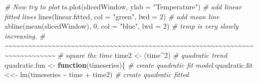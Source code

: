 \documentclass[
]{article}
\newenvironment{Shaded}{\begin{snugshade}}{\end{snugshade}}
\newcommand{\AttributeTok}[1]{\textcolor[rgb]{0.77,0.63,0.00}{#1}}
\newcommand{\CommentTok}[1]{\textcolor[rgb]{0.56,0.35,0.01}{\textit{#1}}}
\newcommand{\ControlFlowTok}[1]{\textcolor[rgb]{0.13,0.29,0.53}{\textbf{#1}}}
\newcommand{\DecValTok}[1]{\textcolor[rgb]{0.00,0.00,0.81}{#1}}
\newcommand{\FunctionTok}[1]{\textcolor[rgb]{0.00,0.00,0.00}{#1}}
\newcommand{\NormalTok}[1]{#1}
\newcommand{\OtherTok}[1]{\textcolor[rgb]{0.56,0.35,0.01}{#1}}
\newcommand{\SpecialCharTok}[1]{\textcolor[rgb]{0.00,0.00,0.00}{#1}}
\newcommand{\StringTok}[1]{\textcolor[rgb]{0.31,0.60,0.02}{#1}}
\begin{document}
\begin{Shaded}
\begin{Highlighting}[]
\CommentTok{\# Now try to plot}
\FunctionTok{ts.plot}\NormalTok{(slicedWindow, }\AttributeTok{ylab =} \StringTok{"Temperature"}\NormalTok{)}
\CommentTok{\# add linear fitted lines}
\FunctionTok{lines}\NormalTok{(linear.fitted, }\AttributeTok{col =} \StringTok{"green"}\NormalTok{, }\AttributeTok{lwd =} \DecValTok{2}\NormalTok{)}
\CommentTok{\# add mean line}
\FunctionTok{abline}\NormalTok{(}\FunctionTok{mean}\NormalTok{(slicedWindow), }\DecValTok{0}\NormalTok{, }\AttributeTok{col =} \StringTok{"blue"}\NormalTok{, }\AttributeTok{lwd =} \DecValTok{2}\NormalTok{)}
\CommentTok{\# temp is very slowly increasing.}
\CommentTok{\# \textasciitilde{}\textasciitilde{}\textasciitilde{}\textasciitilde{}\textasciitilde{}\textasciitilde{}\textasciitilde{}\textasciitilde{}\textasciitilde{}\textasciitilde{}\textasciitilde{}\textasciitilde{}\textasciitilde{}\textasciitilde{}\textasciitilde{}\textasciitilde{}\textasciitilde{}\textasciitilde{}\textasciitilde{}\textasciitilde{}\textasciitilde{}\textasciitilde{}\textasciitilde{}\textasciitilde{}\textasciitilde{}\textasciitilde{}\textasciitilde{}\textasciitilde{}\textasciitilde{}\textasciitilde{}\textasciitilde{}\textasciitilde{}\textasciitilde{}\textasciitilde{}\textasciitilde{}\textasciitilde{}\textasciitilde{}\textasciitilde{}\textasciitilde{}\textasciitilde{}\textasciitilde{}\textasciitilde{}\textasciitilde{}\textasciitilde{}\textasciitilde{}\textasciitilde{}\textasciitilde{}\textasciitilde{}\textasciitilde{}\textasciitilde{}\textasciitilde{}\textasciitilde{}\textasciitilde{}\textasciitilde{}\textasciitilde{}\textasciitilde{}\textasciitilde{}\textasciitilde{}\textasciitilde{}\textasciitilde{}\textasciitilde{}\textasciitilde{}\textasciitilde{}\textasciitilde{}\textasciitilde{}\textasciitilde{}\textasciitilde{}\textasciitilde{}\textasciitilde{}\textasciitilde{}\textasciitilde{}\textasciitilde{}\textasciitilde{}\textasciitilde{}\textasciitilde{}\textasciitilde{}\textasciitilde{}}
\CommentTok{\# square the time}
\NormalTok{time2 }\OtherTok{\textless{}{-}}\NormalTok{ (time}\SpecialCharTok{\^{}}\DecValTok{2}\NormalTok{)}
\CommentTok{\# quadratic trend}
\NormalTok{quadratic.fun }\OtherTok{\textless{}{-}} \ControlFlowTok{function}\NormalTok{(timeseries)\{}
  \CommentTok{\# create quadratic fit model}
\NormalTok{  quadratic.fit }\OtherTok{\textless{}\textless{}{-}} \FunctionTok{lm}\NormalTok{(timeseries }\SpecialCharTok{\textasciitilde{}}\NormalTok{ time }\SpecialCharTok{+}\NormalTok{ time2)}
  \CommentTok{\# create quadratic fitted}

\end{Highlighting}
\end{Shaded}
\end{document}
